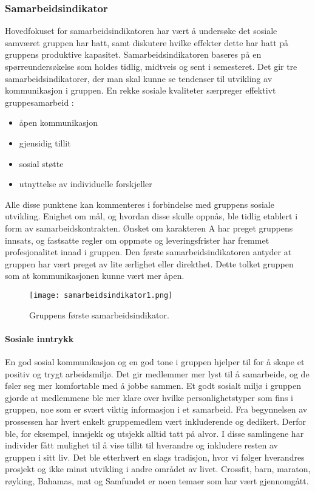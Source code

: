 \subsubsection{Samarbeidsindikator}

Hovedfokuset for samarbeidsindikatoren har vært å undersøke det sosiale samværet gruppen har hatt, samt diskutere hvilke effekter dette har hatt på gruppens produktive kapasitet.
Samarbeidsindikatoren baseres på en spørreundersøkelse som holdes tidlig, midtveis og sent i semesteret.
Det gir tre samarbeidsindikatorer, der man skal kunne se tendenser til utvikling av kommunikasjon i gruppen.
En rekke sosiale kvaliteter særpreger effektivt gruppesamarbeid \cite{orgorg}:

\begin{itemize}
	\item åpen kommunikasjon
	\item gjensidig tillit
	\item sosial støtte
	\item utnyttelse av individuelle forskjeller
\end{itemize}
	
Alle disse punktene kan kommenteres i forbindelse med gruppens sosiale utvikling.
Enighet om mål, og hvordan disse skulle oppnås, ble tidlig etablert i form av samarbeidskontrakten.
Ønsket om karakteren A har preget gruppens innsats, og fastsatte regler om oppmøte og leveringsfrister har fremmet profesjonalitet innad i gruppen.
Den første samarbeidsindikatoren antyder at gruppen har vært preget av lite ærlighet eller direkthet.
Dette tolket gruppen som at kommunikasjonen kunne vært mer åpen.

\begin{figure}[h!]
	\begin{center}
		\caption{Gruppens første samarbeidsindikator.}
		\label{fig:samarbeidsindikator}
		\texttt{[image: samarbeidsindikator1.png]}
	\end{center}
\end{figure}

\paragraph{Sosiale inntrykk}

En god sosial kommunikasjon og en god tone i gruppen hjelper til for å skape et positiv og trygt arbeidsmiljø.
Det gir medlemmer mer lyst til å samarbeide, og de føler seg mer komfortable med å jobbe sammen.
Et godt sosialt miljø i gruppen gjorde at medlemmene ble mer klare over hvilke personlighetstyper som fins i gruppen, noe som er svært viktig informasjon i et samarbeid.
Fra begynnelsen av prossessen har hvert enkelt gruppemedlem vært inkluderende og dedikert. 
Derfor ble, for eksempel, innsjekk og utsjekk alltid tatt på alvor.
I disse samlingene har individer fått mulighet til å vise tillit til hverandre og inkludere resten av gruppen i sitt liv. 
Det ble etterhvert en slags tradisjon, hvor vi følger hverandres prosjekt og ikke minst utvikling i andre området av livet.
Crossfit, barn, maraton, røyking, Bahamas, mat og Samfundet er noen temaer som har vært gjennomgått.

